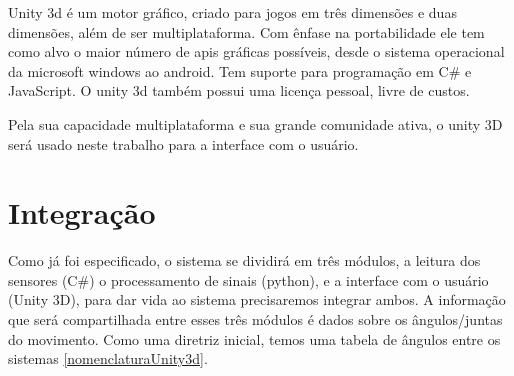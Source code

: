  Unity 3d é um motor gráfico, criado para jogos em três dimensões e duas dimensões, além de ser
multiplataforma. Com ênfase na portabilidade ele tem como alvo o maior número
de apis gráficas possíveis, desde o sistema operacional da microsoft windows 
ao android.  Tem suporte para programação em C\# e JavaScript. O unity 3d também
 possui uma licença pessoal, livre de custos.

  Pela sua capacidade multiplataforma e sua grande comunidade ativa, o unity 3D
será usado neste trabalho para a interface com o usuário.
  
\section{Integração}
\label{Sec:Integração}

  Como já foi especificado, o sistema se dividirá em três módulos, a leitura dos sensores (C\#) o processamento
de sinais (python), e a interface com o usuário (Unity 3D), para dar vida ao sistema
precisaremos integrar ambos. A informação que será compartilhada entre esses três
módulos é dados sobre os ângulos/juntas do movimento. Como uma diretriz inicial,
 temos uma tabela de ângulos entre os sistemas \ref{nomenclaturaUnity3d}.


